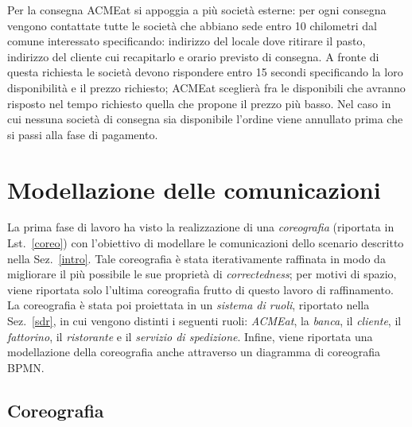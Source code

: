 \documentclass[11pt]{article} %
\begin{document}
Per la consegna ACMEat si appoggia a più società esterne: per ogni consegna vengono contattate tutte le società che abbiano sede entro 10 chilometri dal comune interessato specificando: indirizzo del locale dove ritirare il pasto, indirizzo del cliente cui recapitarlo e orario previsto di consegna. A fronte di questa richiesta le società devono rispondere entro 15 secondi specificando la loro disponibilità e il prezzo richiesto; ACMEat sceglierà fra le disponibili che avranno risposto nel tempo richiesto quella che propone il prezzo più basso. Nel caso in cui nessuna società di consegna sia disponibile l’ordine viene annullato prima che si passi alla fase di pagamento.

\clearpage

\section{Modellazione delle comunicazioni}

La prima fase di lavoro ha visto la realizzazione di una \emph{coreografia} (riportata in Lst.~\ref{coreo}) con l'obiettivo di modellare le comunicazioni dello scenario descritto nella Sez.~\ref{intro}. Tale coreografia è stata iterativamente raffinata in modo da migliorare il più possibile le sue proprietà di \emph{correctedness}; per motivi di spazio, viene riportata solo l'ultima coreografia frutto di questo lavoro di raffinamento. La coreografia è stata poi proiettata in un \emph{sistema di ruoli}, riportato nella Sez.~\ref{sdr}, in cui vengono distinti i seguenti ruoli: \emph{ACMEat}, la \emph{banca}, il \emph{cliente}, il \emph{fattorino}, il \emph{ristorante} e il \emph{servizio di spedizione}. Infine, viene riportata una modellazione della coreografia anche attraverso un diagramma di coreografia BPMN.

\subsection{Coreografia}
\end{document}
